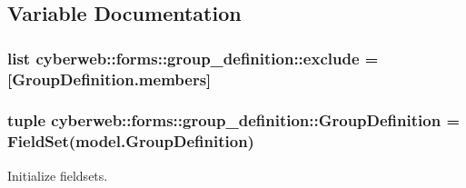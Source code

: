 \subsection{\-Variable \-Documentation}
\hypertarget{namespacecyberweb_1_1forms_1_1group__definition_a6c3dbe34308da70785e9b11e3ca91c00}{
\subsubsection[{exclude}]{\setlength{\rightskip}{0pt plus 5cm}list {\bf cyberweb\-::forms\-::group\-\_\-definition\-::exclude} = \mbox{[}\-Group\-Definition.\-members\mbox{]}}}\label{namespacecyberweb_1_1forms_1_1group__definition_a6c3dbe34308da70785e9b11e3ca91c00}
\hypertarget{namespacecyberweb_1_1forms_1_1group__definition_a8e5cf35d0c0b1c18021829a3ebc8f2ce}{
\subsubsection[{\-Group\-Definition}]{\setlength{\rightskip}{0pt plus 5cm}tuple {\bf cyberweb\-::forms\-::group\-\_\-definition\-::\-Group\-Definition} = \-Field\-Set(model.\-Group\-Definition)}}\label{namespacecyberweb_1_1forms_1_1group__definition_a8e5cf35d0c0b1c18021829a3ebc8f2ce}


\-Initialize fieldsets. 

